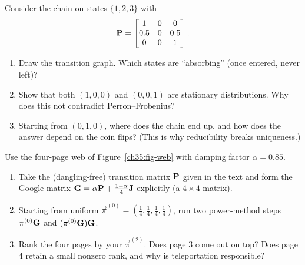 \begin{exercise}
\label{ch35:ex-reducible}
Consider the chain on states $\{1,2,3\}$ with
\[
\mathbf{P} = \begin{bmatrix} 1 & 0 & 0\\ 0.5 & 0 & 0.5\\ 0 & 0 & 1 \end{bmatrix}.
\]
\begin{enumerate}
\item Draw the transition graph. Which states are ``absorbing'' (once entered, never left)?
\item Show that both $(1,0,0)$ and $(0,0,1)$ are stationary distributions. Why does this not
contradict Perron--Frobenius?
\item Starting from $(0,1,0)$, where does the chain end up, and how does the answer depend on
the coin flips? (This is why reducibility breaks uniqueness.)
\end{enumerate}
\end{exercise}

\begin{exercise}
\label{ch35:ex-pagerank}
Use the four-page web of Figure~\ref{ch35:fig-web} with damping factor $\alpha = 0.85$.
\begin{enumerate}
\item Take the (dangling-free) transition matrix $\mathbf{P}$ given in the text and form the Google matrix
$\mathbf{G} = \alpha\mathbf{P} + \tfrac{1-\alpha}{4}\mathbf{J}$ explicitly (a $4\times4$ matrix).
\item Starting from uniform $\vec\pi^{(0)} = (\tfrac14,\tfrac14,\tfrac14,\tfrac14)$, run two
power-method steps $\mathbf{\pi}^{(0)}\mathbf{G}$ and $(\mathbf{\pi}^{(0)}\mathbf{G})\mathbf{G}$.
\item Rank the four pages by your $\vec\pi^{(2)}$. Does page $3$ come out on top? Does page
$4$ retain a small nonzero rank, and why is teleportation responsible?
\end{enumerate}
\end{exercise}

